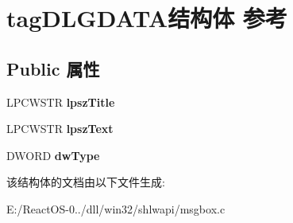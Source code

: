 \hypertarget{structtag_d_l_g_d_a_t_a}{}\section{tag\+D\+L\+G\+D\+A\+T\+A结构体 参考}
\label{structtag_d_l_g_d_a_t_a}
\subsection*{Public 属性}
\begin{DoxyCompactItemize}
\item 
\mbox{\label{structtag_d_l_g_d_a_t_a_a9035f93d2792120a8070986aea75f1c1}} 
L\+P\+C\+W\+S\+TR {\bfseries lpsz\+Title}
\item 
\mbox{\label{structtag_d_l_g_d_a_t_a_a2b7c5fd126cae5ac10e5f8b5e72c4745}} 
L\+P\+C\+W\+S\+TR {\bfseries lpsz\+Text}
\item 
\mbox{\label{structtag_d_l_g_d_a_t_a_a39d743b47d8daea1a5c0740908c0b8a1}} 
D\+W\+O\+RD {\bfseries dw\+Type}
\end{DoxyCompactItemize}


该结构体的文档由以下文件生成\+:\begin{DoxyCompactItemize}
\item 
E\+:/\+React\+O\+S-\/0../dll/win32/shlwapi/msgbox.\+c\end{DoxyCompactItemize}
